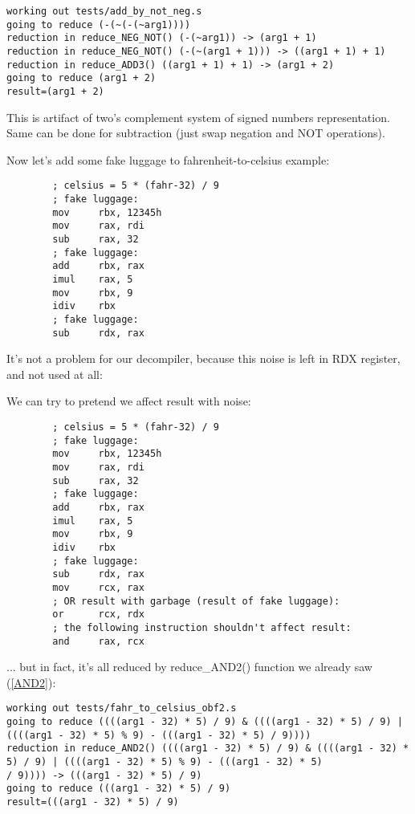 ﻿\documentclass[12pt]{article}
\begin{document}
\begin{lstlisting}
working out tests/add_by_not_neg.s
going to reduce (-(~(-(~arg1))))
reduction in reduce_NEG_NOT() (-(~arg1)) -> (arg1 + 1)
reduction in reduce_NEG_NOT() (-(~(arg1 + 1))) -> ((arg1 + 1) + 1)
reduction in reduce_ADD3() ((arg1 + 1) + 1) -> (arg1 + 2)
going to reduce (arg1 + 2)
result=(arg1 + 2)
\end{lstlisting}

This is artifact of two's complement system of signed numbers representation.
Same can be done for subtraction (just swap negation and NOT operations).

Now let's add some fake luggage to fahrenheit-to-celsius example:

\begin{lstlisting}
        ; celsius = 5 * (fahr-32) / 9
        ; fake luggage:
        mov     rbx, 12345h
        mov     rax, rdi
        sub     rax, 32
        ; fake luggage:
        add     rbx, rax
        imul    rax, 5
        mov     rbx, 9
        idiv    rbx
        ; fake luggage:
        sub     rdx, rax
\end{lstlisting}

It's not a problem for our decompiler, because this noise is left in RDX register, and not used at all:



We can try to pretend we affect result with noise:

\begin{lstlisting}
        ; celsius = 5 * (fahr-32) / 9
        ; fake luggage:
        mov     rbx, 12345h
        mov     rax, rdi
        sub     rax, 32
        ; fake luggage:
        add     rbx, rax
        imul    rax, 5
        mov     rbx, 9
        idiv    rbx
        ; fake luggage:
        sub     rdx, rax
        mov     rcx, rax
        ; OR result with garbage (result of fake luggage):
        or      rcx, rdx
        ; the following instruction shouldn't affect result:
        and     rax, rcx
\end{lstlisting}

... but in fact, it's all reduced by reduce\_AND2() function we already saw (\ref{AND2}):

\begin{lstlisting}
working out tests/fahr_to_celsius_obf2.s
going to reduce ((((arg1 - 32) * 5) / 9) & ((((arg1 - 32) * 5) / 9) | ((((arg1 - 32) * 5) % 9) - (((arg1 - 32) * 5) / 9))))
reduction in reduce_AND2() ((((arg1 - 32) * 5) / 9) & ((((arg1 - 32) * 5) / 9) | ((((arg1 - 32) * 5) % 9) - (((arg1 - 32) * 5)
/ 9)))) -> (((arg1 - 32) * 5) / 9)
going to reduce (((arg1 - 32) * 5) / 9)
result=(((arg1 - 32) * 5) / 9)
\end{lstlisting}
\end{document}
